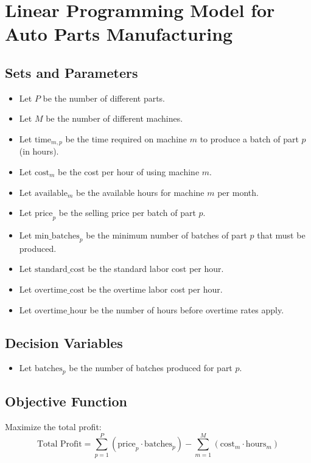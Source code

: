 \documentclass{article}
\begin{document}
\section*{Linear Programming Model for Auto Parts Manufacturing}

\subsection*{Sets and Parameters}
\begin{itemize}
    \item Let \( P \) be the number of different parts.
    \item Let \( M \) be the number of different machines.
    \item Let \( \text{time}_{m,p} \) be the time required on machine \( m \) to produce a batch of part \( p \) (in hours).
    \item Let \( \text{cost}_{m} \) be the cost per hour of using machine \( m \).
    \item Let \( \text{available}_{m} \) be the available hours for machine \( m \) per month.
    \item Let \( \text{price}_{p} \) be the selling price per batch of part \( p \).
    \item Let \( \text{min\_batches}_{p} \) be the minimum number of batches of part \( p \) that must be produced.
    \item Let \( \text{standard\_cost} \) be the standard labor cost per hour.
    \item Let \( \text{overtime\_cost} \) be the overtime labor cost per hour.
    \item Let \( \text{overtime\_hour} \) be the number of hours before overtime rates apply.
\end{itemize}

\subsection*{Decision Variables}
\begin{itemize}
    \item Let \( \text{batches}_{p} \) be the number of batches produced for part \( p \).
\end{itemize}

\subsection*{Objective Function}
Maximize the total profit:
\[
\text{Total Profit} = \sum_{p=1}^{P} \left( \text{price}_{p} \cdot \text{batches}_{p} \right) - \sum_{m=1}^{M} \left( \text{cost}_{m} \cdot \text{hours}_{m} \right)
\]
\end{document}
